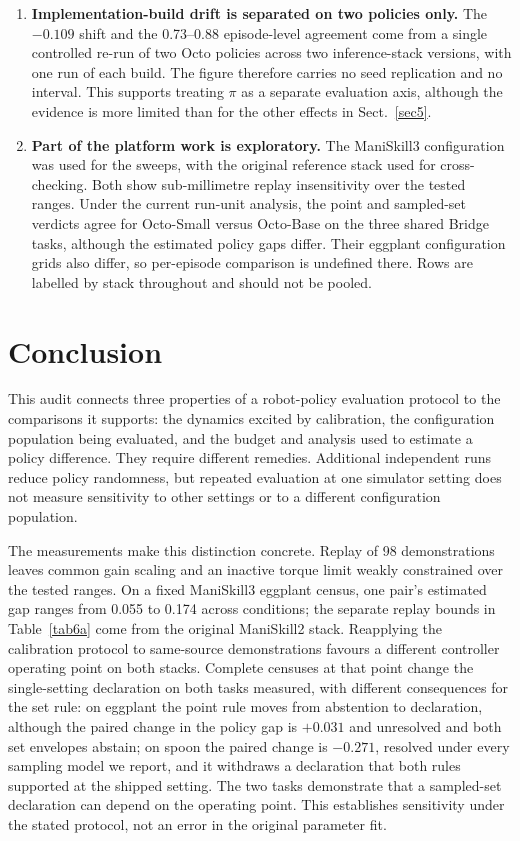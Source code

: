 \documentclass[pdflatex,iicol,sn-apa]{sn-jnl}
\theoremstyle{remark}
\begin{document}
\begin{enumerate}
\item \textbf{Implementation-build drift is separated on two policies only.} The $-0.109$ shift and
the 0.73--0.88 episode-level agreement come from a single controlled re-run of two Octo policies
across two inference-stack versions, with one run of each build. The figure therefore carries no seed
replication and no interval. This supports treating $\pi$ as a separate evaluation axis, although
the evidence is more limited than for the other effects in Sect.~\ref{sec5}.

\item \textbf{Part of the platform work is exploratory.} The ManiSkill3 configuration was used for
the sweeps, with the original reference stack used for cross-checking. Both show sub-millimetre
replay insensitivity over the tested ranges. Under the current run-unit analysis, the point and
sampled-set verdicts agree for Octo-Small versus Octo-Base on the three shared Bridge tasks,
although the estimated policy gaps differ. Their eggplant configuration grids also differ, so
per-episode comparison is undefined there. Rows are labelled by stack throughout and should not be pooled.
\end{enumerate}

\section{Conclusion}\label{sec10}

This audit connects three properties of a robot-policy evaluation protocol to the comparisons it
supports: the dynamics excited by calibration, the configuration population being evaluated, and
the budget and analysis used to estimate a policy difference. They require different remedies.
Additional independent runs reduce policy randomness, but repeated evaluation at one simulator
setting does not measure sensitivity to other settings or to a different configuration population.

The measurements make this distinction concrete. Replay of 98 demonstrations leaves common gain
scaling and an inactive torque limit weakly constrained over the tested ranges. On a fixed
ManiSkill3 eggplant census, one pair's estimated gap ranges from 0.055 to 0.174 across conditions;
the separate replay bounds in Table~\ref{tab6a} come from the original ManiSkill2 stack. Reapplying
the calibration protocol to same-source demonstrations favours a different controller operating
point on both stacks. Complete censuses at that point change the single-setting declaration on both
tasks measured, with different consequences for the set rule: on eggplant the point rule moves
from abstention to declaration, although the paired change in the policy gap is $+0.031$ and
unresolved and both set envelopes abstain; on spoon the paired change is
$-0.271$, resolved under every sampling model we report, and it withdraws a declaration that both
rules supported at the shipped setting. The two tasks demonstrate that a sampled-set declaration
can depend on the operating point. This establishes sensitivity under
the stated protocol, not an error in the original parameter fit.
\end{document}

